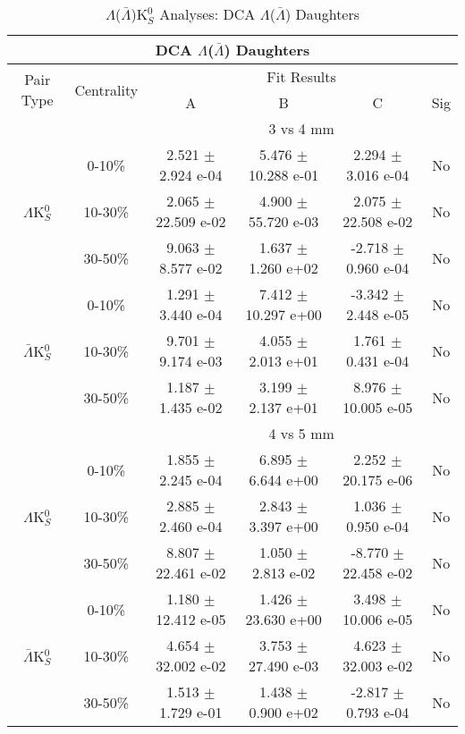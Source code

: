 \documentclass[../AnalysisNoteJBuxton.tex]{subfiles}
\begin{document}
\begin{table}
 \centering
 \begin{tabular}{|c|c|c|c|c|c|}
  \multicolumn{6}{c}{DCA $\Lambda$($\bar{\Lambda}$) Daughters} \\
  \hline
  \multirow{2}{*}{Pair Type} & \multirow{2}{*}{Centrality} & \multicolumn{4}{c|}{Fit Results} \\
  \cline{3-6}
   & & A & B & C & Sig \\  
  \hline
  \multicolumn{2}{|c}{} & \multicolumn{4}{c|}{3 vs 4 mm} \\  
  \hline  
  \multirow{3}{*}{$\Lambda$K$^{0}_{S}$}
   &  0-10\% & 2.521 $\pm$ 2.924 e-04 & 5.476 $\pm$ 10.288 e-01 & 2.294 $\pm$ 3.016 e-04 & No \\
   & 10-30\% & 2.065 $\pm$ 22.509 e-02 & 4.900 $\pm$ 55.720 e-03 & 2.075 $\pm$ 22.508 e-02 & No \\
   & 30-50\% & 9.063 $\pm$ 8.577 e-02 & 1.637 $\pm$ 1.260 e+02 & -2.718 $\pm$ 0.960 e-04 & No \\
  \hline
  \multirow{3}{*}{$\bar{\Lambda}$K$^{0}_{S}$}  
   &  0-10\% & 1.291 $\pm$ 3.440 e-04 & 7.412 $\pm$ 10.297 e+00 & -3.342 $\pm$ 2.448 e-05 & No \\
   & 10-30\% & 9.701 $\pm$ 9.174 e-03 & 4.055 $\pm$ 2.013 e+01 & 1.761 $\pm$ 0.431 e-04 & No \\
   & 30-50\% & 1.187 $\pm$ 1.435 e-02 & 3.199 $\pm$ 2.137 e+01 & 8.976 $\pm$ 10.005 e-05 & No \\
  \hline 
  \multicolumn{2}{|c}{} & \multicolumn{4}{c|}{4 vs 5 mm} \\
  \hline  
  \multirow{3}{*}{$\Lambda$K$^{0}_{S}$}   
   &  0-10\% & 1.855 $\pm$ 2.245 e-04 & 6.895 $\pm$ 6.644 e+00 & 2.252 $\pm$ 20.175 e-06 & No \\
   & 10-30\% & 2.885 $\pm$ 2.460 e-04 & 2.843 $\pm$ 3.397 e+00 & 1.036 $\pm$ 0.950 e-04 & No \\
   & 30-50\% & 8.807 $\pm$ 22.461 e-02 & 1.050 $\pm$ 2.813 e-02 & -8.770 $\pm$ 22.458 e-02 & No \\
  \hline  
  \multirow{3}{*}{$\bar{\Lambda}$K$^{0}_{S}$}
   &  0-10\% & 1.180 $\pm$ 12.412 e-05 & 1.426 $\pm$ 23.630 e+00 & 3.498 $\pm$ 10.006 e-05 & No \\
   & 10-30\% & 4.654 $\pm$ 32.002 e-02 & 3.753 $\pm$ 27.490 e-03 & 4.623 $\pm$ 32.003 e-02 & No \\
   & 30-50\% & 1.513 $\pm$ 1.729 e-01 & 1.438 $\pm$ 0.900 e+02 & -2.817 $\pm$ 0.793 e-04 & No \\
  \hline
 \end{tabular}
 \caption{$\Lambda$($\bar{\Lambda}$)K$^{0}_{S}$ Analyses: DCA $\Lambda$($\bar{\Lambda}$) Daughters}
 \label{tab:LamDaughtersDcaLamK0Full}
\end{table}
\end{document}
